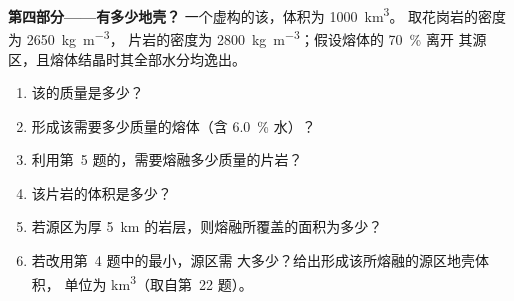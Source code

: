 \begin{problem}
\noindent\textbf{第四部分——有多少地壳？}
一个虚构的该，体积为 \qty{1000}{\cubic\kilo\metre}。
取花岗岩的密度为 \qty{2650}{\kilogram\per\cubic\metre}，
片岩的密度为 \qty{2800}{\kilogram\per\cubic\metre}；假设熔体的 \qty{70}{\percent} 离开
其源区，且熔体结晶时其全部水分均逸出。
\begin{enumerate}[resume]
\item 该的质量是多少？
\item 形成该需要多少质量的熔体（含 \qty{6.0}{\percent} 水）？
\item 利用第~5 题的，需要熔融多少质量的片岩？
\item 该片岩的体积是多少？
\item 若源区为厚 \qty{5}{km} 的岩层，则熔融所覆盖的面积为多少？
\item 若改用第~4 题中的最小，源区需
大多少？给出形成该所熔融的源区地壳体积，
单位为 \unit{\cubic\kilo\metre}（取自第~22 题）。
\end{enumerate}
\end{problem}
